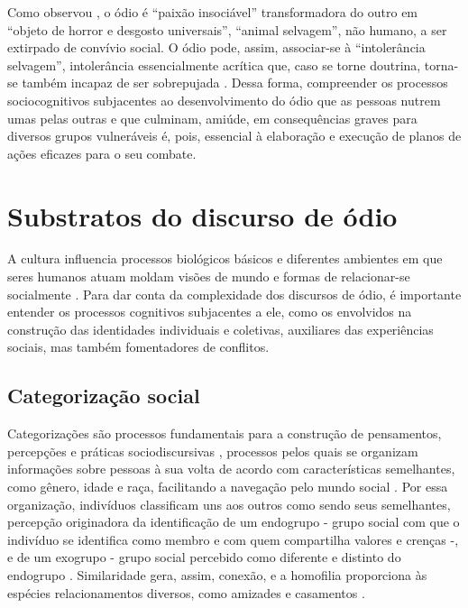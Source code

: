 \documentclass[portuguese]{textolivre}
\begin{document}
Como observou \textcite[p. 46]{smith2015teoria}, o ódio é “paixão insociável” transformadora do outro em “objeto de horror e desgosto universais”, “animal selvagem”, não humano, a ser extirpado de convívio social. O ódio pode, assim, associar-se à “intolerância selvagem”, intolerância essencialmente acrítica que, caso se torne doutrina, torna-se também incapaz de ser sobrepujada \cite{eco2020migraccao}. Dessa forma, compreender os processos sociocognitivos subjacentes ao desenvolvimento do ódio que as pessoas nutrem umas pelas outras e que culminam, amiúde, em consequências graves para diversos grupos vulneráveis é, pois, essencial à elaboração e execução de planos de ações eficazes para o seu combate.


\section{Substratos do discurso de ódio}

A cultura influencia processos biológicos básicos e diferentes ambientes em que seres humanos atuam moldam visões de mundo e formas de relacionar-se socialmente \cite{marsh2020fear}. Para dar conta da complexidade dos discursos de ódio, é importante entender os processos cognitivos subjacentes a ele, como os envolvidos na construção das identidades individuais e coletivas, auxiliares das experiências sociais, mas também fomentadores de conflitos.


\subsection{ Categorização social}

Categorizações são processos fundamentais para a construção de pensamentos, percepções e práticas sociodiscursivas \cite{lakoff2008women}, processos pelos quais se organizam informações sobre pessoas à sua volta de acordo com características semelhantes, como gênero, idade e raça, facilitando a navegação pelo mundo social \cite{rhodes2019development}. Por essa organização, indivíduos classificam uns aos outros como sendo seus semelhantes, percepção originadora da identificação de um endogrupo - grupo social com que o indivíduo se identifica como membro e com quem compartilha valores e crenças -, e de um exogrupo - grupo social percebido como diferente e distinto do endogrupo \cite{tropp2001ingroup}. Similaridade gera, assim, conexão, e a homofilia proporciona às espécies relacionamentos diversos, como amizades e casamentos \cite{mcpherson2001birds}.
\end{document}
